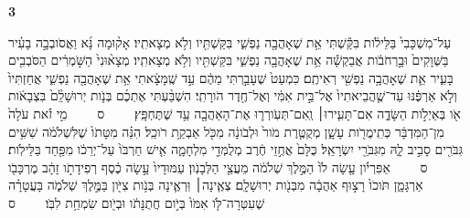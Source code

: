 \documentclass[a4paper]{article}
\newcommand{\rdrchap}[1]{\begin{english}\setRL\small\textbf{#1}\end{english}}
\newcommand{\rdrverse}[1]{\raisebox{2.5pt}{\smaller[4]#1}}
\newcommand{\setuma}{~~~~{\scriptsize ס}~~~~}
\begin{document}
\begin{hebrew}
\begin{multicols}{2}
\rdrchap{3}\rdrverse{1} עַל־מִשְׁכָּבִי֙ בַּלֵּילֹ֔ות בִּקַּ֕שְׁתִּי אֵ֥ת שֶׁאָהֲבָ֖ה נַפְשִׁ֑י בִּקַּשְׁתִּ֖יו וְלֹ֥א מְצָאתִֽיו׃ 
\rdrverse{2} אָק֨וּמָה נָּ֜א וַאֲסֹובְבָ֣ה בָעִ֗יר בַּשְּׁוָקִים֙ וּבָ֣רְחֹבֹ֔ות אֲבַקְשָׁ֕ה אֵ֥ת שֶׁאָהֲבָ֖ה נַפְשִׁ֑י בִּקַּשְׁתִּ֖יו וְלֹ֥א מְצָאתִֽיו׃ 
\rdrverse{3} מְצָא֨וּנִי֙ הַשֹּׁ֣מְרִ֔ים הַסֹּבְבִ֖ים בָּעִ֑יר אֵ֛ת שֶׁאָהֲבָ֥ה נַפְשִׁ֖י רְאִיתֶֽם׃ 
\rdrverse{4} כִּמְעַט֙ שֶׁעָבַ֣רְתִּי מֵהֶ֔ם עַ֣ד שֶֽׁמָּצָ֔אתִי אֵ֥ת שֶׁאָהֲבָ֖ה נַפְשִׁ֑י אֲחַזְתִּיו֙ וְלֹ֣א אַרְפֶּ֔נּוּ עַד־שֶׁ֤הֲבֵיאתִיו֙ אֶל־בֵּ֣ית אִמִּ֔י וְאֶל־חֶ֖דֶר הֹורָתִֽי׃ 
\rdrverse{5} הִשְׁבַּ֨עְתִּי אֶתְכֶ֜ם בְּנֹ֤ות יְרוּשָׁלִַ֨ם֙ בִּצְבָאֹ֔ות אֹ֖ו בְּאַיְלֹ֣ות הַשָּׂדֶ֑ה אִם־תָּעִ֧ירוּ׀ וְֽאִם־תְּעֹֽורְר֛וּ אֶת־הָאַהֲבָ֖ה עַ֥ד שֶׁתֶּחְפָּֽץ׃ \setuma{} 
\rdrverse{6} מִ֣י זֹ֗את עֹלָה֙ מִן־הַמִּדְבָּ֔ר כְּתִֽימֲרֹ֖ות עָשָׁ֑ן מְקֻטֶּ֤רֶת מֹור֙ וּלְבֹונָ֔ה מִכֹּ֖ל אַבְקַ֥ת רֹוכֵֽל׃ 
\rdrverse{7} הִנֵּ֗ה מִטָּתֹו֙ שֶׁלִּשְׁלֹמֹ֔ה שִׁשִּׁ֥ים גִּבֹּרִ֖ים סָבִ֣יב לָ֑הּ מִגִּבֹּרֵ֖י יִשְׂרָאֵֽל׃ 
\rdrverse{8} כֻּלָּם֙ אֲחֻ֣זֵי חֶ֔רֶב מְלֻמְּדֵ֖י מִלְחָמָ֑ה אִ֤ישׁ חַרְבֹּו֙ עַל־יְרֵכֹ֔ו מִפַּ֖חַד בַּלֵּילֹֽות׃ \setuma{} 
\rdrverse{9} אַפִּרְיֹ֗ון עָ֤שָׂה לֹו֙ הַמֶּ֣לֶךְ שְׁלֹמֹ֔ה מֵעֲצֵ֖י הַלְּבָנֹֽון׃ 
\rdrverse{10} עַמּוּדָיו֙ עָ֣שָׂה כֶ֔סֶף רְפִידָתֹ֣ו זָהָ֔ב מֶרְכָּבֹ֖ו אַרְגָּמָ֑ן תֹּוכֹו֙ רָצ֣וּף אַהֲבָ֔ה מִבְּנֹ֖ות יְרוּשָׁלִָֽם׃ 
\rdrverse{11} צְאֶ֧ינָה׀ וּֽרְאֶ֛ינָה בְּנֹ֥ות צִיֹּ֖ון בַּמֶּ֣לֶךְ שְׁלֹמֹ֑ה בָּעֲטָרָ֗ה שֶׁעִטְּרָה־לֹּ֤ו אִמֹּו֙ בְּיֹ֣ום חֲתֻנָּתֹ֔ו וּבְיֹ֖ום שִׂמְחַ֥ת לִבֹּֽו׃ \setuma{} 



\end{multicols}
\end{hebrew}
\end{document}
